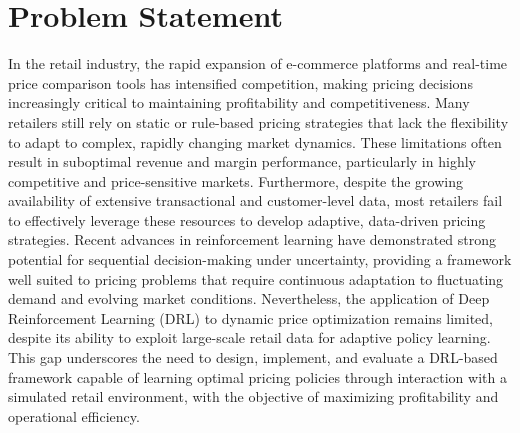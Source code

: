 \chapter{Problem Statement}
In the retail industry, the rapid expansion of e-commerce platforms and real-time price comparison tools has intensified competition, making pricing decisions increasingly critical to maintaining profitability and competitiveness. Many retailers still rely on static or rule-based pricing strategies that lack the flexibility to adapt to complex, rapidly changing market dynamics. These limitations often result in suboptimal revenue and margin performance, particularly in highly competitive and price-sensitive markets. Furthermore, despite the growing availability of extensive transactional and customer-level data, most retailers fail to effectively leverage these resources to develop adaptive, data-driven pricing strategies. Recent advances in reinforcement learning have demonstrated strong potential for sequential decision-making under uncertainty, providing a framework well suited to pricing problems that require continuous adaptation to fluctuating demand and evolving market conditions. Nevertheless, the application of Deep Reinforcement Learning (DRL) to dynamic price optimization remains limited, despite its ability to exploit large-scale retail data for adaptive policy learning. This gap underscores the need to design, implement, and evaluate a DRL-based framework capable of learning optimal pricing policies through interaction with a simulated retail environment, with the objective of maximizing profitability and operational efficiency.
